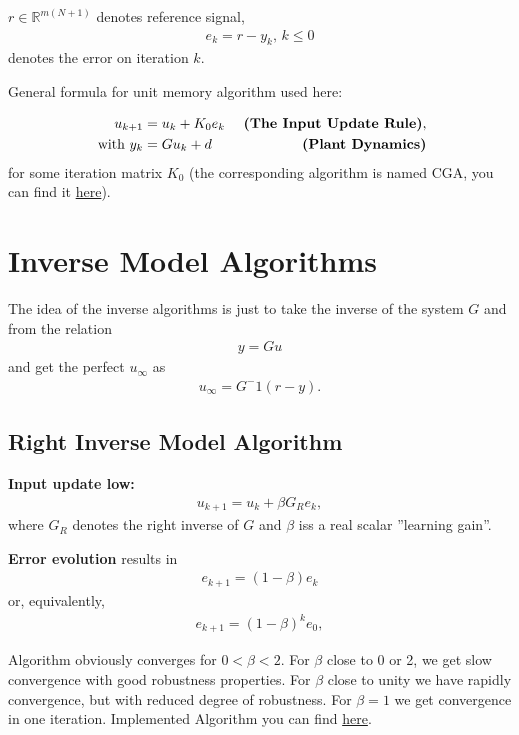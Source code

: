 \documentclass[12pt,ngerman]{article}
\begin{document}
	$r \in \mathbb{R}^{m(N+1)}$ denotes reference signal, 
	\begin{align*}
	e_k = r - y_k, \, k\leq 0
	\end{align*}
	denotes the error on iteration $k$. 
	
	General formula for unit memory algorithm used here: 
	
	\begin{align}
	u_{k+1} &= u_k + K_0 e_k &\text{ \textbf{(The Input Update Rule)}}, \\
	\text{ with } y_k &= Gu_k + d &\text{ \textbf{(Plant Dynamics)}}
	\end{align}
	for some iteration matrix $K_0$ (the corresponding algorithm is named CGA, you can find it \href{run ./MATLAB/CGA.m}{here}).
	
	
	
	\section{Inverse Model Algorithms}
	
	The idea of the inverse algorithms is just to take the inverse of the system $G$ and from the relation 
	\begin{align*}
	y = G u
	\end{align*}
	and get the perfect $u_\infty$ as 
	\begin{align*}
	u_\infty = G^-1 (r- y).
	\end{align*}
	
	\subsection{Right Inverse Model Algorithm} 
	\textbf{Input update low:}
	\begin{align}
	u_{k+1} = u_k + \beta G_R e_k,
	\end{align}
	where $G_R$ denotes the right inverse of $G$ and $\beta$ iss a real scalar ''learning gain''. 
	
	\textbf{Error evolution} results in
	\begin{align*}
	e_{k+1} = (1-\beta) e_k
	\end{align*}
	or, equivalently, 
	\begin{align*}
	e_{k+1} = (1-\beta)^k e_0,
	\end{align*}
	
	Algorithm obviously converges for $0 < 
	\beta < 2$. For $\beta$ close to 0 or 2, we get slow convergence with good robustness properties. For $\beta$ close to unity we have rapidly convergence, but with reduced degree of robustness. For $\beta = 1$ we get convergence in one iteration. 
	Implemented Algorithm you can find \href{run ./MATLAB/RIA.m}{here}. 
	
\end{document}
